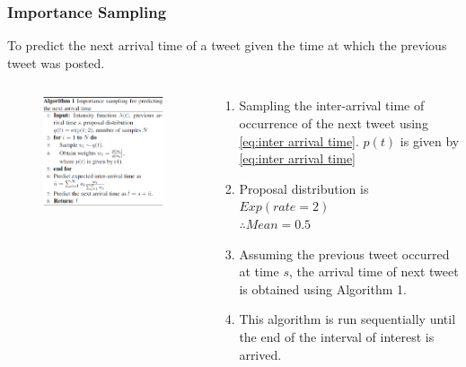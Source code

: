 \documentclass{beamer}
\providecommand{\brak}[1]{\ensuremath{\left(#1\right)}}
\begin{document}
\begin{frame}
\frametitle{Importance Sampling}
To predict the next arrival time of a tweet given the time at which the previous tweet was posted.
\begin{columns}
\begin{column}{0.5\textwidth}
\begin{figure}
\begin{flushleft}
\includegraphics[width=\columnwidth]{importance sampling.PNG}
\end{flushleft}
\end{figure}
\end{column}
\begin{column}{0.5\textwidth}
\begin{enumerate}
    \item Sampling the inter-arrival time of occurrence of the next tweet using \eqref{eq:inter arrival time}. $p\brak t$ is given by \eqref{eq:inter arrival time}
    \item Proposal distribution is $Exp\brak{rate= 2}$\\ 
    $\therefore Mean=0.5$ 
    \item Assuming the previous tweet occurred at time $s$, the arrival time of next tweet is obtained using Algorithm 1.
    \item This algorithm is run sequentially until the end of the interval of interest is arrived.
\end{enumerate}
\end{column}
\end{columns}
\end{frame}
\end{document}
